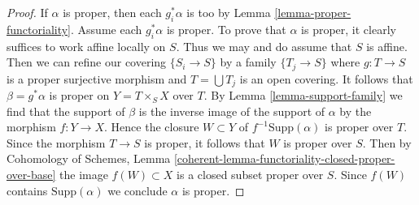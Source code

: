 \documentclass{stacks-project}
\theoremstyle{plain}
\theoremstyle{definition}
\theoremstyle{remark}
\numberwithin{equation}{subsection}
\begin{document}
\begin{proof}
If $\alpha$ is proper, then each $g_i^*\alpha$ is too by
Lemma \ref{lemma-proper-functoriality}. Assume each $g_i^*\alpha$
is proper. To prove that $\alpha$ is proper, it clearly suffices
to work affine locally on $S$. Thus we may and do assume that $S$
is affine. Then we can refine our covering $\{S_i \to S\}$
by a family $\{T_j \to S\}$ where $g : T \to S$ is a proper surjective
morphism and $T = \bigcup T_j$ is an open covering.
It follows that $\beta = g^*\alpha$ is proper on $Y = T \times_S X$
over $T$. By Lemma \ref{lemma-support-family} we find that the support
of $\beta$ is the inverse image of the support of $\alpha$ by the
morphism $f : Y \to X$. Hence the closure $W \subset Y$
of $f^{-1}\text{Supp}(\alpha)$ is proper over $T$. Since the
morphism $T \to S$ is proper, it follows that $W$ is proper over $S$.
Then by Cohomology of Schemes, Lemma
\ref{coherent-lemma-functoriality-closed-proper-over-base}
the image $f(W) \subset X$ is a closed subset proper over $S$.
Since $f(W)$ contains $\text{Supp}(\alpha)$ we conclude $\alpha$
is proper.
\end{proof}
\end{document}
